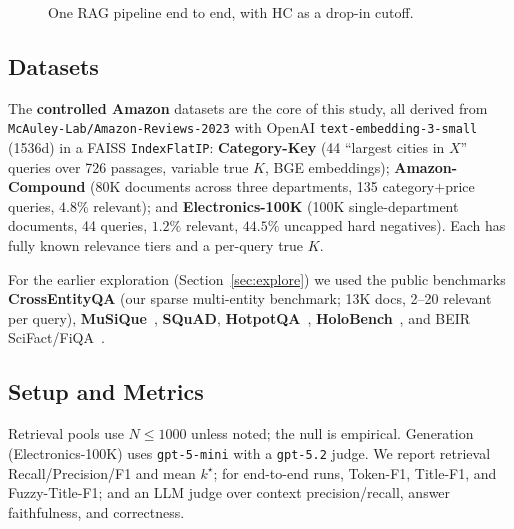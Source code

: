 \documentclass[letterpaper]{article}
\begin{document}
\begin{figure}[t]
\centering
{}
\caption{One RAG pipeline end to end, with HC as a drop-in cutoff.}
\label{fig:arch}
\end{figure}

\subsection{Datasets}
The \textbf{controlled Amazon} datasets are the core of this study, all
derived from \texttt{McAuley-Lab/Amazon-Reviews-2023} with OpenAI
\texttt{text-embedding-3-small} (1536d) in a FAISS
\texttt{IndexFlatIP}: \textbf{Category-Key} (44 ``largest cities in
$X$'' queries over 726 passages, variable true $K$, BGE embeddings);
\textbf{Amazon-Compound} (80K documents across three departments, 135
category$+$price queries, $4.8\%$ relevant); and
\textbf{Electronics-100K} (100K single-department documents, 44
queries, $1.2\%$ relevant, $44.5\%$ uncapped hard negatives). Each has
fully known relevance tiers and a per-query true $K$.

For the earlier exploration (Section~\ref{sec:explore}) we used the
public benchmarks \textbf{CrossEntityQA} (our sparse multi-entity
benchmark; 13K docs, 2--20 relevant per query),
\textbf{MuSiQue}~\cite{trivedi2022musique},
\textbf{SQuAD}, \textbf{HotpotQA}~\cite{yang2018hotpotqa},
\textbf{HoloBench}~\cite{maekawa2024holobench}, and BEIR
SciFact/FiQA~\cite{thakur2021beir,wadden2020scifact}.

\subsection{Setup and Metrics}
Retrieval pools use $N\!\le\!1000$ unless noted; the null is empirical.
Generation (Electronics-100K) uses \texttt{gpt-5-mini} with a
\texttt{gpt-5.2} judge. We report retrieval Recall/Precision/F1 and
mean $k^\star$; for end-to-end runs, Token-F1, Title-F1, and
Fuzzy-Title-F1; and an LLM judge over context precision/recall, answer
faithfulness, and correctness.

\end{document}
